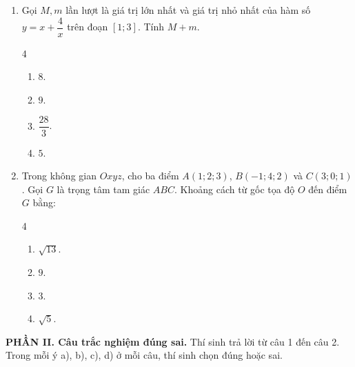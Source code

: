 \documentclass[12pt]{article}
\begin{document}
\begin{enumerate}[label=\textbf{Câu \arabic*.}, leftmargin=*]
		\item Gọi $M, m$ lần lượt là giá trị lớn nhất và giá trị nhỏ nhất của hàm số $y = x + \dfrac{4}{x}$ trên đoạn $[1; 3]$. Tính $M + m$.
		\begin{multicols}{4}
			\begin{enumerate}[label=\Alph*.]
				\item $8$.
				\item $9$.
				\item $\dfrac{28}{3}$.
				\item $5$.
			\end{enumerate}
		\end{multicols}
		
		\item Trong không gian $Oxyz$, cho ba điểm $A(1; 2; 3)$, $B(-1; 4; 2)$ và $C(3; 0; 1)$. Gọi $G$ là trọng tâm tam giác $ABC$. Khoảng cách từ gốc tọa độ $O$ đến điểm $G$ bằng:
		\begin{multicols}{4}
			\begin{enumerate}[label=\Alph*.]
				\item $\sqrt{13}$.
				\item $9$.
				\item $3$.
				\item $\sqrt{5}$.
			\end{enumerate}
		\end{multicols}
		
	\end{enumerate}
	
	\vspace{6mm}
	\noindent\textbf{PHẦN II. Câu trắc nghiệm đúng sai.} Thí sinh trả lời từ câu 1 đến câu 2. Trong mỗi ý a), b), c), d) ở mỗi câu, thí sinh chọn đúng hoặc sai.
	\vspace{3mm}
	
\end{document}
